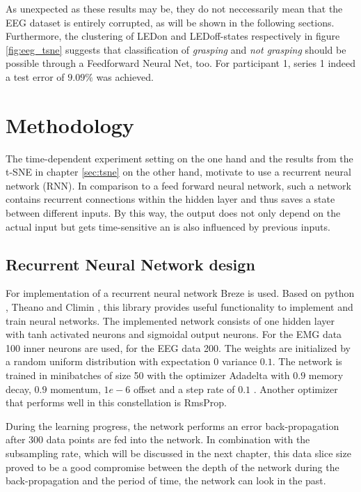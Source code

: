 \documentclass{article} %
\begin{document}
As unexpected as these results may be, they do not neccessarily mean that the EEG dataset is entirely corrupted, as will be shown in the following sections. Furthermore, the clustering of LEDon and LEDoff-states respectively in figure \ref{fig:eeg_tsne} suggests that classification of \emph{grasping} and \emph{not grasping} should be possible through a Feedforward Neural Net, too. For participant 1, series 1 indeed a test error of $9.09\%$ was achieved.  

\section{Methodology}
The time-dependent experiment setting on the one hand and the results from the t-SNE in chapter \ref{sec:tsne} on the other hand, motivate to use a recurrent neural network (RNN). In comparison to a feed forward neural network, such a network contains recurrent connections within the hidden layer and thus saves a state between different inputs. By this way, the output does not only depend on the actual input but gets time-sensitive an is also influenced by previous inputs.

\subsection{Recurrent Neural Network design}
For implementation of a recurrent neural network Breze \cite{breze} is used.
Based on python \cite{python}, Theano \cite{theano} and Climin \cite{climin}, this library provides useful functionality to implement and train neural networks.
The implemented network consists of one hidden layer with tanh activated neurons and sigmoidal output neurons.
For the EMG data 100 inner neurons are used, for the EEG data 200.
The weights are initialized by a random uniform distribution with expectation $0$ variance $0.1$.
The network is trained in minibatches of size 50 with the optimizer Adadelta with $0.9$ memory decay, $0.9$ momentum, $1e-6$ offset and a step rate of $0.1$
. Another optimizer that performs well in this constellation is RmsProp.

During the learning progress, the network performs an error back-propagation after $300$ data points are fed into the network. In combination with the subsampling rate, which will be discussed in the next chapter, this data slice size proved to be a good compromise between the depth of the network during the back-propagation and the period of time, the network can look in the past.
\end{document}
